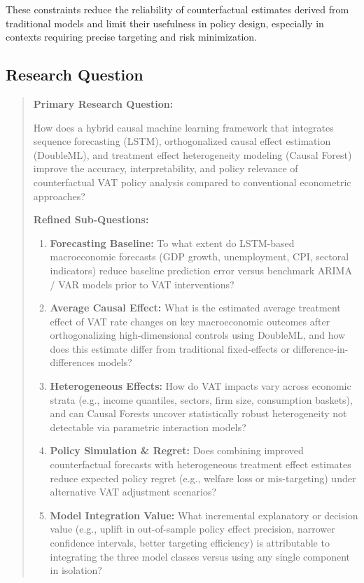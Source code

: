 These constraints reduce the reliability of counterfactual estimates derived from traditional models and limit their usefulness in policy design, especially in contexts requiring precise targeting and risk minimization.

\subsection{Research Question}\label{subsec:research_question}

\begin{quote}
\textbf{Primary Research Question:}

How does a hybrid causal machine learning framework that integrates sequence forecasting (LSTM), orthogonalized causal effect estimation (DoubleML), and treatment effect heterogeneity modeling (Causal Forest) improve the accuracy, interpretability, and policy relevance of counterfactual VAT policy analysis compared to conventional econometric approaches?

\textbf{Refined Sub-Questions:}

\begin{enumerate}
    \item \textbf{Forecasting Baseline:} To what extent do LSTM-based macroeconomic forecasts (GDP growth, unemployment, CPI, sectoral indicators) reduce baseline prediction error versus benchmark ARIMA / VAR models prior to VAT interventions?
    
    \item \textbf{Average Causal Effect:} What is the estimated average treatment effect of VAT rate changes on key macroeconomic outcomes after orthogonalizing high-dimensional controls using DoubleML, and how does this estimate differ from traditional fixed-effects or difference-in-differences models?
    
    \item \textbf{Heterogeneous Effects:} How do VAT impacts vary across economic strata (e.g., income quantiles, sectors, firm size, consumption baskets), and can Causal Forests uncover statistically robust heterogeneity not detectable via parametric interaction models?
    
    \item \textbf{Policy Simulation \& Regret:} Does combining improved counterfactual forecasts with heterogeneous treatment effect estimates reduce expected policy regret (e.g., welfare loss or mis-targeting) under alternative VAT adjustment scenarios?
    
    \item \textbf{Model Integration Value:} What incremental explanatory or decision value (e.g., uplift in out-of-sample policy effect precision, narrower confidence intervals, better targeting efficiency) is attributable to integrating the three model classes versus using any single component in isolation?

\end{enumerate}
\end{quote}

